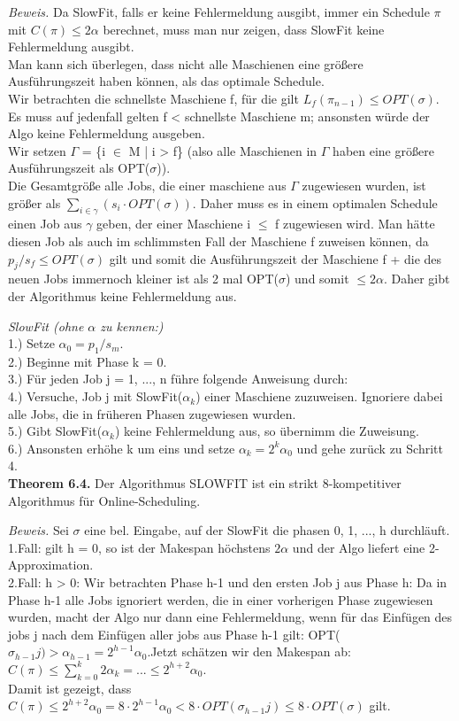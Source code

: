 \textit{Beweis.} Da SlowFit, falls er keine Fehlermeldung ausgibt, immer ein Schedule $\pi$ mit $C(\pi) \le 2 \alpha$ berechnet, muss man nur zeigen, dass SlowFit keine Fehlermeldung ausgibt.\\
Man kann sich überlegen, dass nicht alle Maschienen eine größere Ausführungszeit haben können, als das optimale Schedule. \\
Wir betrachten die schnellste Maschiene f, für die gilt $L_{f}(\pi_{n-1}) \le OPT(\sigma)$. Es muss auf jedenfall gelten f < schnellste Maschiene m; ansonsten würde der Algo keine Fehlermeldung ausgeben.\\
Wir setzen $\Gamma$ = \{i $\in$ M | i > f\} (also alle Maschienen in $\Gamma$ haben eine größere Ausführungszeit als OPT($\sigma$)).\\
Die Gesamtgröße alle Jobs, die einer maschiene aus $\Gamma$ zugewiesen wurden, ist größer als $\sum_{i \in \gamma}(s_{i} \cdot OPT(\sigma))$. Daher muss es in einem optimalen Schedule einen Job aus $\gamma$ geben, der einer Maschiene i $\le$ f zugewiesen wird. Man hätte diesen Job als auch im schlimmsten Fall der Maschiene f zuweisen können, da $p_{j}/s_{f} \le OPT(\sigma)$ gilt und somit die Ausführungszeit der Maschiene f + die des neuen Jobs immernoch kleiner ist als 2 mal OPT($\sigma$) und somit $\le 2\alpha$. Daher gibt der Algorithmus keine Fehlermeldung aus.

\textit{SlowFit (ohne $\alpha$ zu kennen:)}\\
1.) Setze $\alpha_{0} = p_{1}/s_{m}$. \\
2.) Beginne mit Phase k = 0. \\
3.) Für jeden Job j = 1, ..., n führe folgende Anweisung durch: \\
4.) Versuche, Job j mit SlowFit($\alpha_{k}$) einer Maschiene zuzuweisen. Ignoriere dabei alle Jobs, die in früheren Phasen zugewiesen wurden. \\
5.) Gibt SlowFit($\alpha_{k}$) keine Fehlermeldung aus, so übernimm die Zuweisung. \\
6.) Ansonsten erhöhe k um eins und setze $\alpha_{k} = 2^{k}\alpha_{0}$ und gehe zurück zu Schritt 4. \\


\textbf{Theorem 6.4.} Der Algorithmus SLOWFIT ist ein strikt 8-kompetitiver Algorithmus für Online-Scheduling.

\textit{Beweis.} Sei $\sigma$ eine bel. Eingabe, auf der SlowFit die phasen 0, 1, ..., h durchläuft.\\
1.Fall: gilt h = 0, so ist der Makespan höchstens $2\alpha$ und der Algo liefert eine 2-Approximation.\\
2.Fall: h > 0: Wir betrachten Phase h-1 und den ersten Job j aus Phase h: Da in Phase h-1 alle Jobs ignoriert werden, die in einer vorherigen Phase zugewiesen wurden, macht der Algo nur dann eine Fehlermeldung, wenn für das Einfügen des jobs j nach dem Einfügen aller jobs aus Phase h-1 gilt: OPT($\sigma_{h-1}j) > \alpha_{h-1} = 2^{h-1}\alpha_{0}$.Jetzt schätzen wir den Makespan ab: $C(\pi) \le \sum_{k=0}^{k}2\alpha_{k} = ... \le 2^{h+2}\alpha_{0}$.\\
Damit ist gezeigt, dass $C(\pi) \le 2^{h+2}\alpha_{0} = 8 \cdot 2^{h-1} \alpha_{0} < 8 \cdot OPT(\sigma_{h-1}j) \le 8 \cdot OPT(\sigma)$ gilt.
